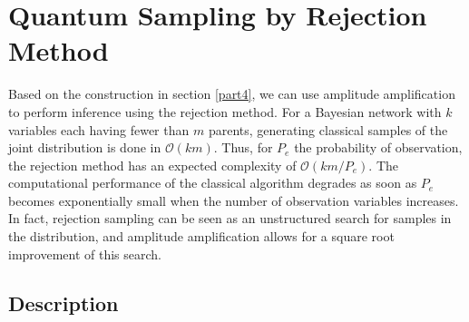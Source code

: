 \section{Quantum Sampling by Rejection Method}

Based on the construction in section \ref{part4}, we can use amplitude amplification to perform inference using the rejection method. For a Bayesian network with $k$ variables each having fewer than $m$ parents, generating classical samples of the joint distribution is done in $\mathcal{O}(km)$. Thus, for $P_e$ the probability of observation, the rejection method has an expected complexity of $\mathcal{O}(km/P_e)$. The computational performance of the classical algorithm degrades as soon as $P_e$ becomes exponentially small when the number of observation variables increases. In fact, rejection sampling can be seen as an unstructured search for samples in the distribution, and amplitude amplification allows for a square root improvement of this search. \cite{low2014quantum}

\subsection{Description}

